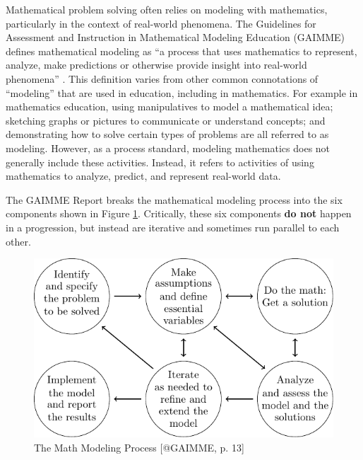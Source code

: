 \documentclass[
]{book}
\theoremstyle{definition}
\theoremstyle{definition}
\theoremstyle{definition}
\theoremstyle{remark}
\begin{document}
Mathematical problem solving often relies on modeling with mathematics, particularly in the context of real-world phenomena. The Guidelines for Assessment and Instruction in Mathematical Modeling Education (GAIMME) defines mathematical modeling as ``a process that uses mathematics to represent, analyze, make predictions or otherwise provide insight into real-world phenomena'' \citep[p.~8]{GAIMME}. This definition varies from other common connotations of ``modeling'' that are used in education, including in mathematics. For example in mathematics education, using manipulatives to model a mathematical idea; sketching graphs or pictures to communicate or understand concepts; and demonstrating how to solve certain types of problems are all referred to as modeling. However, as a process standard, modeling mathematics does not generally include these activities. Instead, it refers to activities of using mathematics to analyze, predict, and represent real-world data.

The GAIMME Report breaks the mathematical modeling process into the six components shown in Figure \ref{fig:GAIMME}. Critically, these six components \textbf{do not} happen in a progression, but instead are iterative and sometimes run parallel to each other.

\begin{figure}

{\centering \includegraphics[width=0.7\linewidth]{tikz/GAIMME} 

}

\caption{The Math Modeling Process [@GAIMME, p. 13]}\label{fig:GAIMME}
\end{figure}
\end{document}
